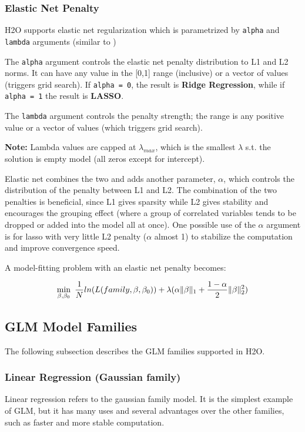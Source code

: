 \subsubsection{Elastic Net Penalty}

H2O supports elastic net regularization which is parametrized by \texttt{alpha} and \texttt{lambda} arguments
(similar to )

The \texttt{alpha} argument controls the elastic net penalty distribution to L1 and L2 norms. It can have any value
in the [0,1] range (inclusive) or a vector of values (triggers grid search). If \texttt{alpha = 0}, the result
is \textbf{Ridge Regression}, while if \texttt{alpha = 1} the result is \textbf{LASSO}.

The \texttt{lambda} argument controls the penalty strength; the range is any positive value or a vector of values
(which triggers grid search).

\textbf{Note:} Lambda values are capped at $\lambda_{max}$, which is the smallest $\lambda$ s.t. the solution is
empty model (all zeros except for intercept).

Elastic net combines the two and adds another parameter, $\alpha$, which controls the distribution of the penalty
between L1 and L2. The combination of the two penalties is beneficial, since L1 gives sparsity while L2 gives
stability and encourages the grouping effect (where a group of correlated variables tends to be dropped or added
into the model all at once). One possible use of the $\alpha$ argument is for lasso with very little L2 penalty
($\alpha$ almost 1) to stabilize the computation and improve convergence speed.

A model-fitting problem with an elastic net penalty becomes:

\[ \min\limits_{\beta,\beta_0}\ {{1\over{N}} ln(L(family,\beta,\beta_0))  + \lambda (\alpha \| \beta \|_1}  + {1- \alpha \over 2} \| \beta \|_2^2) \]

\subsection{GLM Model Families}
The following subsection describes the GLM families supported in H2O. 

\subsubsection{Linear Regression (Gaussian family)}
Linear regression refers to the gaussian family model. It is the simplest example of GLM, but it has many uses and
several advantages over the other families, such as faster and more stable computation.


